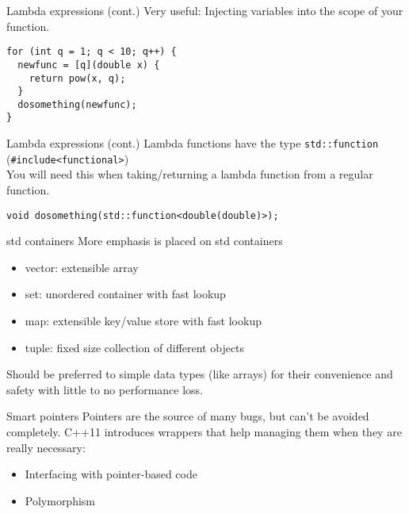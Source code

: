 \documentclass[compress,aspectratio=43]{beamer}
\begin{document}
\begin{frame}[fragile]{Lambda expressions (cont.)}
  Very useful: Injecting variables into the scope of your function.
  \begin{verbatim}
for (int q = 1; q < 10; q++) {
  newfunc = [q](double x) {
    return pow(x, q);
  }
  dosomething(newfunc);
}
  \end{verbatim}
\end{frame}

\begin{frame}[fragile]{Lambda expressions (cont.)}
  Lambda functions have the type \texttt{std::function} (\texttt{\#include<functional>})\\
  You will need this when taking/returning a lambda function from a regular function.
  \begin{verbatim}
void dosomething(std::function<double(double)>);
  \end{verbatim}
\end{frame} 

\begin{frame}{std containers}
  More emphasis is placed on std containers
  \begin{itemize}
    \item vector: extensible array
    \item set: unordered container with fast lookup
    \item map: extensible key/value store with fast lookup
    \item tuple: fixed size collection of different objects
  \end{itemize}
  Should be preferred to simple data types (like arrays) for their convenience and safety with little to no performance loss.
\end{frame}

\begin{frame}{Smart pointers}
  Pointers are the source of many bugs, but can't be avoided completely.
  C++11 introduces wrappers that help managing them when they are really necessary:
  \begin{itemize}
    \item Interfacing with pointer-based code
    \item Polymorphism
  \end{itemize}
\end{frame}
\end{document}
